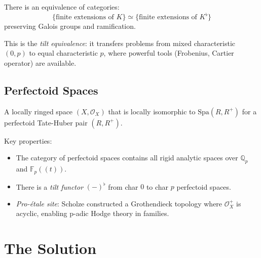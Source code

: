 \begin{theorem}
There is an equivalence of categories:
\[
\{\text{finite extensions of } K\} \simeq \{\text{finite extensions of } K^\flat\}
\]
preserving Galois groups and ramification.
\end{theorem}

This is the \emph{tilt equivalence}: it transfers problems from mixed characteristic $(0,p)$ to equal characteristic $p$, where powerful tools (Frobenius, Cartier operator) are available.

\subsection{Perfectoid Spaces}
\begin{definition}
A locally ringed space $(X, \mathcal{O}_X)$ that is locally isomorphic to $\text{Spa}(R, R^+)$ for a perfectoid Tate-Huber pair $(R, R^+)$.
\end{definition}

Key properties:
\begin{itemize}
\item The category of perfectoid spaces contains all rigid analytic spaces over $\mathbb{Q}_p$ and $\mathbb{F}_p((t))$.
\item There is a \emph{tilt functor} $(-)^{\flat}$ from char $0$ to char $p$ perfectoid spaces.
\item \emph{Pro-\'etale site}: Scholze constructed a Grothendieck topology where $\mathcal{O}_X^+$ is acyclic, enabling p-adic Hodge theory in families.
\end{itemize}

\section{The Solution}

